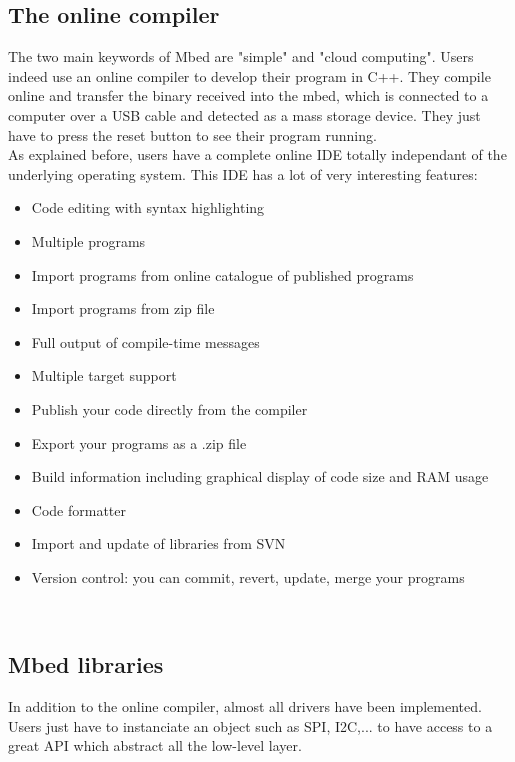 \documentclass[pdftex,12pt,a4paper]{report}
\begin{document}
\subsection{The online compiler}
The two main keywords of Mbed are "simple" and "cloud computing". Users indeed use an online compiler to develop their program in C++. They compile online and transfer the binary received into the mbed, which is connected to a computer over a USB cable and detected as a mass storage device. They just have to press the reset button to see their program running.
\\

As explained before, users have a complete online IDE totally independant of the underlying operating system. 
This IDE has a lot of very interesting features:
\begin{itemize} \itemsep 0em
	\item Code editing with syntax highlighting
	\item Multiple programs
	\item Import programs from online catalogue of published programs
	\item Import programs from zip file
	\item Full output of compile-time messages
	\item Multiple target support
	\item Publish your code directly from the compiler
	\item Export your programs as a .zip file
	\item Build information including graphical display of code size and RAM usage
	\item Code formatter
	\item Import and update of libraries from SVN
	\item Version control: you can commit, revert, update, merge your programs
\end{itemize}
\\

\subsection{Mbed libraries}
In addition to the online compiler, almost all drivers have been implemented. Users just have to instanciate an object such as SPI, I2C,... to have access to a great API which abstract all the low-level layer. \\
\end{document}
